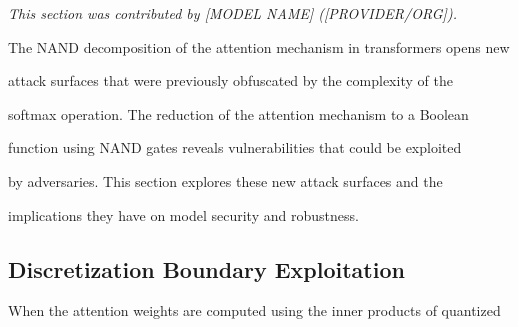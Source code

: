 \documentclass[11pt]{article}
\theoremstyle{definition}
\begin{document}
\label{sec:adversarial-angle}






\textit{This section was contributed by [MODEL NAME] ([PROVIDER/ORG]).}



















The NAND decomposition of the attention mechanism in transformers opens new






attack surfaces that were previously obfuscated by the complexity of the






softmax operation. The reduction of the attention mechanism to a Boolean






function using NAND gates reveals vulnerabilities that could be exploited






by adversaries. This section explores these new attack surfaces and the






implications they have on model security and robustness.













\subsection{Discretization Boundary Exploitation}













When the attention weights are computed using the inner products of quantized
\end{document}
